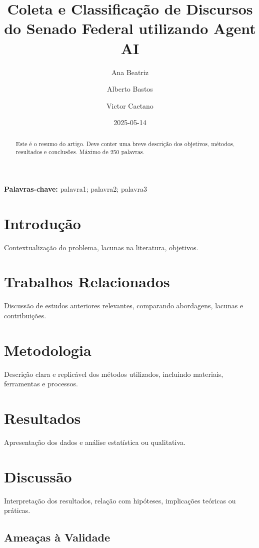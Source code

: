 \documentclass[
]{article}
\title{Coleta e Classificação de Discursos do Senado Federal utilizando
Agent AI}
\author{Ana Beatriz \and Alberto Bastos \and Victor Caetano}
\date{2025-05-14}
\begin{document}
\maketitle

{
\setcounter{tocdepth}{5}
\tableofcontents
}
\begin{abstract}
Este é o resumo do artigo. Deve conter uma breve descrição dos objetivos, métodos, resultados e conclusões. Máximo de 250 palavras.
\end{abstract}

\textbf{Palavras-chave:} palavra1; palavra2; palavra3

\section{Introdução}

Contextualização do problema, lacunas na literatura, objetivos.

\section{Trabalhos Relacionados}

Discussão de estudos anteriores relevantes, comparando abordagens,
lacunas e contribuições.

\section{Metodologia}

Descrição clara e replicável dos métodos utilizados, incluindo
materiais, ferramentas e processos.

\section{Resultados}

Apresentação dos dados e análise estatística ou qualitativa.

\section{Discussão}

Interpretação dos resultados, relação com hipóteses, implicações
teóricas ou práticas.

\subsection{Ameaças à Validade}
\end{document}
